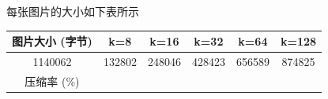 \documentclass[lang=cn,11pt]{elegantpaper}
\begin{document}
每张图片的大小如下表所示
\begin{table}[]
    \centering
    \begin{tabular}{c|ccccc}
    \hline
    图片大小 (字节)  & k=8    & k=16   & k=32   & k=64   & k=128  \\ \hline
    1140062  & 132802 & 248046 & 428423 & 656589 & 874825 \\
    压缩率 (\%) &        &        &        &        &        \\ \hline
    \end{tabular}
    \end{table}

\newpage
\nocite{*}



\end{document}
